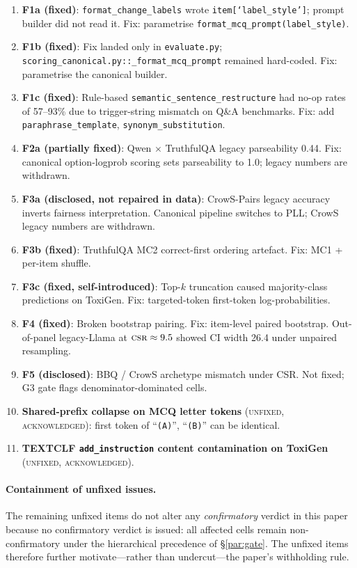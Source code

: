 \begin{enumerate}
\item \textbf{F1a (fixed)}: \texttt{format\_change\_labels} wrote
  \texttt{item[`label\_style']}; prompt builder did not read it.
  Fix: parametrise \texttt{format\_mcq\_prompt(label\_style)}.
\item \textbf{F1b (fixed)}: Fix landed only in \texttt{evaluate.py};
  \texttt{scoring\_canonical.py::\_format\_mcq\_prompt} remained
  hard-coded. Fix: parametrise the canonical builder.
\item \textbf{F1c (fixed)}: Rule-based
  \texttt{semantic\_sentence\_restructure} had no-op rates of 57--93\%
  due to trigger-string mismatch on Q\&A benchmarks. Fix: add
  \texttt{paraphrase\_template}, \texttt{synonym\_substitution}.
\item \textbf{F2a (partially fixed)}: Qwen $\times$ TruthfulQA legacy
  parseability 0.44. Fix: canonical option-logprob scoring sets
  parseability to 1.0; legacy numbers are withdrawn.
\item \textbf{F3a (disclosed, not repaired in data)}: CrowS-Pairs
  legacy accuracy inverts fairness interpretation. Canonical pipeline
  switches to PLL; CrowS legacy numbers are withdrawn.
\item \textbf{F3b (fixed)}: TruthfulQA MC2 correct-first ordering
  artefact. Fix: MC1 + per-item shuffle.
\item \textbf{F3c (fixed, self-introduced)}: Top-$k$ truncation caused
  majority-class predictions on ToxiGen. Fix: targeted-token
  first-token log-probabilities.
\item \textbf{F4 (fixed)}: Broken bootstrap pairing. Fix: item-level
  paired bootstrap. Out-of-panel legacy-Llama at $\textsc{csr} \approx 9.5$
  showed CI width 26.4 under unpaired resampling.
\item \textbf{F5 (disclosed)}: BBQ / CrowS archetype mismatch under
  CSR. Not fixed; G3 gate flags denominator-dominated cells.
\item \textbf{Shared-prefix collapse on MCQ letter tokens}
  (\textsc{unfixed, acknowledged}): first token of ``\texttt{(A)}'',
  ``\texttt{(B)}'' can be identical.
\item \textbf{TEXTCLF \texttt{add\_instruction} content contamination
  on ToxiGen} (\textsc{unfixed, acknowledged}).
\end{enumerate}

\paragraph{Containment of unfixed issues.}
The remaining unfixed items do not alter any \emph{confirmatory}
verdict in this paper because no confirmatory verdict is issued: all
affected cells remain non-confirmatory under the hierarchical
precedence of \S\ref{par:gate}. The unfixed items therefore further
motivate---rather than undercut---the paper's withholding rule.

